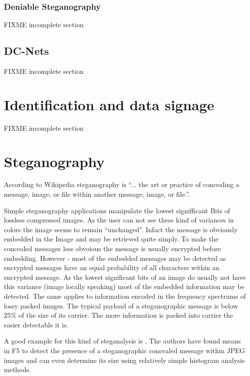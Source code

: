 \subsubsection{Deniable Steganography}
FIXME incomplete section

\subsection{DC-Nets}
\cite{chaum-dc}
FIXME incomplete section

\section{Identification and data signage}
FIXME incomplete section

\section{Steganography}
According to Wikipedia steganography\cite{wiki:steganographie} is ``... the art or practice of concealing a message, image, or file within another message, image, or file.''. \par

Simple steganography applications manipulate the lowest signifficant Bits of lossless compressed images. As the user can not see these kind of variances in colors the image seems to remain ``unchanged''. Infact the message is obviously embedded in the Image and may be retrieved quite simply. To make the concealed messages less obvoious the message is usually encrypted before embedding. However - most of the embedded messages may be detected as encrypted messages have an equal probability of all characters within an encrypted message. As the lowest significant bits of an image do usually not have this variance (image locally speaking) most of the embedded information may be detected. The same applies to information encoded in the frequency spectrums of lossy packed images. The typical payload of a steganographic message is below $25\%$ of the size of its carrier. The more information is packed into carrier the easier detectable it is.\par

A good example for this kind of steganalysis is . The authors have found means in F5\cite{f5} to detect the presence of a steganographic concealed message within JPEG images and can even determine its size using relatively simple histogram analysis methods.\par

